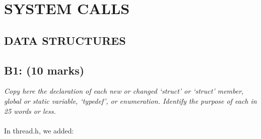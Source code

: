 \documentclass{article}
\begin{document}
\section{SYSTEM CALLS}

\subsection{DATA STRUCTURES}

\subsection*{B1: (10 marks) }

\textit{Copy here the declaration of each new or changed ‘struct’ or ‘struct’
member, global or static variable, ‘typedef’, or enumeration. Identify the
purpose of each in 25 words or less.}
\\\\
In thread.h, we added:
\end{document}
